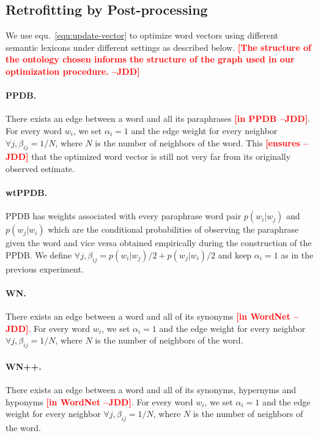 \documentclass[11pt]{article}
\newcommand{\jdd}[1]{\textcolor{red}{\bf\small [#1 --JDD]}}
\begin{document}
\subsection{Retrofitting by Post-processing}
\label{sec:exp-post-proc}

We use equ.~\ref{equ:update-vector} to optimize word vectors using different 
semantic lexicons under different settings as described below. \jdd{The structure of the ontology chosen informs the structure of the graph used in our optimization procedure.}

\paragraph{PPDB.} There exists an edge between a word and all its paraphrases \jdd{in PPDB}. For every word $w_i$, we set $\alpha_i = 1$ and the edge weight for every neighbor $\forall j, \beta_{ij} = 1/N$, where $N$ is the number of neighbors of the word. This \jdd{ensures}  that the optimized word vector is still not very far from its originally observed estimate.

\paragraph{wtPPDB.} PPDB has weights associated with every paraphrase word pair $p(w_i | w_j)$ and $p(w_j |w_i)$ which are the conditional probabilities of 
observing the paraphrase given the word and vice versa obtained empirically during the construction of the PPDB. We define $\forall j, \beta_{ij} = p(w_i | w_j)/2 + p(w_j |w_i)/2$ and keep $\alpha_i = 1$ as in the previous experiment. 

\paragraph{WN.} There exists an edge between a word and all of its synonyms \jdd{in WordNet}. 
For every word $w_i$, we set $\alpha_i = 1$ and the edge weight for every neighbor 
$\forall j, \beta_{ij} = 1/N$, where $N$ is the number of neighbors of the word. 

\paragraph{WN++.} There exists an edge between a word and all of its synonyms, 
hypernyms and hyponyms \jdd{in WordNet}. For every word $w_i$, we set $\alpha_i = 1$ and the edge weight
for every neighbor $\forall j, \beta_{ij} = 1/N$, where $N$ is the number of neighbors of the word. 
\end{document}
